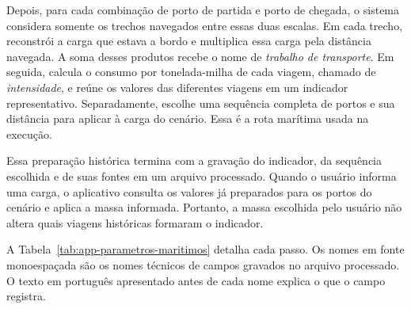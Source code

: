 Depois, para cada combinação de porto de partida e porto de chegada, o sistema considera somente os trechos navegados entre essas duas escalas. Em cada trecho, reconstrói a carga que estava a bordo e multiplica essa carga pela distância navegada. A soma desses produtos recebe o nome de \emph{trabalho de transporte}. Em seguida, calcula o consumo por tonelada-milha de cada viagem, chamado de \emph{intensidade}, e reúne os valores das diferentes viagens em um indicador representativo. Separadamente, escolhe uma sequência completa de portos e sua distância para aplicar à carga do cenário. Essa é a rota marítima usada na execução.

Essa preparação histórica termina com a gravação do indicador, da sequência escolhida e de suas fontes em um arquivo processado. Quando o usuário informa uma carga, o aplicativo consulta os valores já preparados para os portos do cenário e aplica a massa informada. Portanto, a massa escolhida pelo usuário não altera quais viagens históricas formaram o indicador.

A Tabela~\ref{tab:app-parametros-maritimos} detalha cada passo. Os nomes em fonte monoespaçada são os nomes técnicos de campos gravados no arquivo processado. O texto em português apresentado antes de cada nome explica o que o campo registra.

